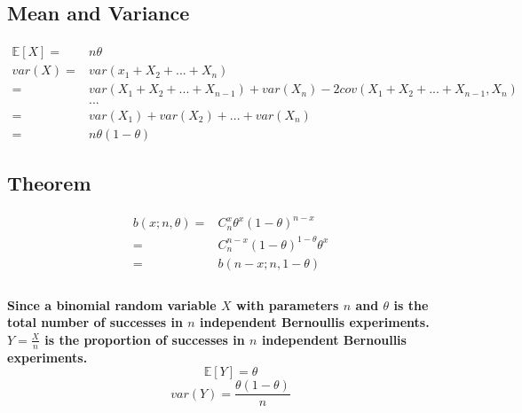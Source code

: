 \documentclass[titlepage]{article}
\begin{document}
        \subsection*{Mean and Variance}
            \paragraph{
                \begin{equation*}
                    \begin{split}
                        \mathbb{E}[X]=&n\theta\\
                        var(X)=&var(x_1+X_2+...+X_n)\\
                            =&var(X_1+X_2+...+X_{n-1})+var(X_n)-2cov(X_1+X_2+...+X_{n-1},X_n)\\
                            &...\\
                            =&var(X_1)+var(X_2)+...+var(X_n)\\
                            =&n\theta(1-\theta)
                    \end{split}
                \end{equation*}
            }
        \subsection*{Theorem}
                \paragraph{
                    \begin{equation*}
                        \begin{split}
                            b(x;n,\theta)=&C_n^x\theta^x(1-\theta)^{n-x}\\
                                =&C_n^{n-x}(1-\theta)^{1-\theta}\theta^x\\
                                =&b(n-x;n,1-\theta)\\
                        \end{split}
                    \end{equation*}
                }
                \paragraph{
                    Since a binomial random variable $X$ with parameters $n$ and $\theta$ is the total number of successes in $n$ independent Bernoullis experiments. $Y=\frac{X}{n}$ is the proportion of successes in $n$ independent Bernoullis experiments.
                    $$\mathbb{E}[Y]=\theta$$
                    $$var(Y)=\frac{\theta(1-\theta)}{n}$$
                }
\end{document}
